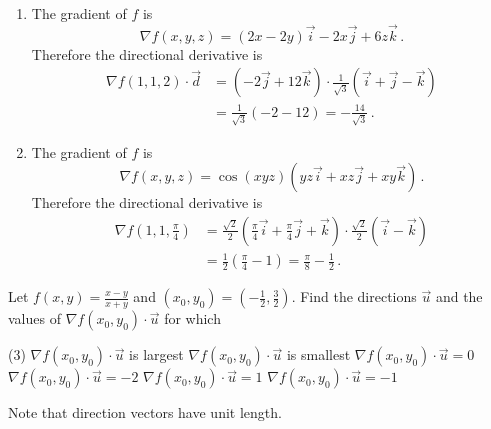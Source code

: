 \begin{solution}
\begin{enumerate}
\item
The gradient of $f$ is
\[
\nabla f(x,y,z) = (2x-2y) \vec i - 2x \vec j + 6z \vec k\,.
\]
Therefore the directional derivative is
\begin{align*}
\nabla f(1,1,2) \cdot \vec d &= \left( - 2 \vec j + 12 \vec k \right) \cdot
\frac 1{\sqrt{3}} \left(\vec i + \vec j - \vec k \right) \\
&= \frac 1{\sqrt 3} \left( -2 -12 \right) = -\frac{14}{\sqrt 3}\,.
\end{align*}

\item
The gradient of $f$ is
\[
\nabla f(x,y,z) = \cos(xyz) \left( yz \vec i + xz \vec j + xy \vec k \right)\,.
\]
Therefore the directional derivative is
\begin{align*}
\nabla f\left(1, 1, \frac \pi 4 \right) 
&= \frac{\sqrt 2}2 \left(\frac \pi 4 \vec i + \frac \pi 4 \vec j + \vec k \right)
\cdot \frac{\sqrt 2}2 \left(\vec i - \vec k \right) \\
&= \frac 12 \left( \frac \pi 4 - 1 \right) = \frac \pi 8 - \frac 12\,.
\end{align*}
\end{enumerate}
\end{solution}

\begin{question}
Let 
$f(x,y) = \frac{x-y}{x+y}$ and 
$(x_0,y_0) = \left(-\frac 12, \frac 32\right)$. 
Find the directions $\vec u$ and the values of $\nabla f(x_0,y_0) \cdot \vec u$ for which
\begin{tasks}(3)
\task
$\nabla f(x_0,y_0) \cdot \vec u$ is largest
\task
$\nabla f(x_0,y_0) \cdot \vec u$ is smallest
\task
$\nabla f(x_0,y_0) \cdot \vec u = 0$
\task
$\nabla f(x_0,y_0) \cdot \vec u = -2$
\task
$\nabla f(x_0,y_0) \cdot \vec u = 1$
\task
$\nabla f(x_0,y_0) \cdot \vec u = -1$
\end{tasks}
Note that direction vectors have unit length.
\end{question}

